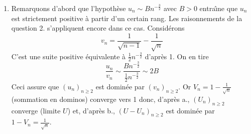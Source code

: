 \begin{enumerate}
  \item Remarquons d'abord que l'hypoth{\`e}se $u_n \sim Bn^{-\frac{3}{2}}$ avec $B>0$ entra{\^\i}ne que $u_n$ est strictement positive {\`a} partir d'un certain rang. Les raisonnements de la question 2. s'appliquent encore dans ce cas. Consid{\'e}rons
\begin{displaymath}
  v_n=\frac{1}{\sqrt{n-1}}-\frac{1}{\sqrt{n}}
\end{displaymath}
C'est une suite positive équivalente à $\frac{1}{2}n^{-\frac{3}{2}}$ d'apr{\`e}s 1. On en tire
\begin{displaymath}
  \frac{u_n}{v_n}\sim \frac{B n^{-\frac{3}{2}}}{\frac{1}{2}n^{-\frac{3}{2}}} \sim 2B
\end{displaymath}
Ceci assure que $(u_n)_{n\geq 2}$ est domin{\'e}e par $(v_n)_{n\geq 2}$. \newline
Or $V_n=1-\frac{1}{\sqrt{n}}$ (sommation en dominos) converge vers 1 donc, d'apr{\`e}s a., $(U_n)_{n\geq 2}$ converge (limite $U$) et, d'apr{\`e}s b., $(U-U_n)_{n\geq 2}$ est domin{\'e}e par $1-V_n=\frac{1}{\sqrt{n}}$.
\end{enumerate}

